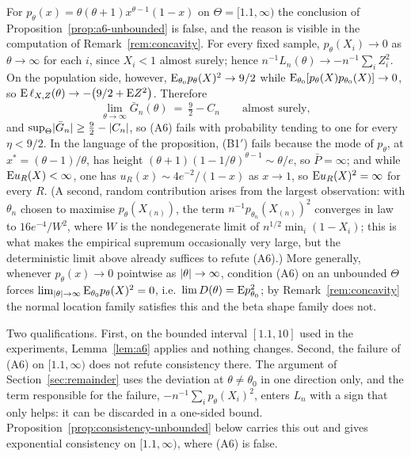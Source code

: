 \begin{remark}
\label{rem:a6-beta-unbounded}
For $p_\theta(x)=\theta(\theta+1)x^{\theta-1}(1-x)$ on $\Theta=[1.1,\infty)$ the conclusion of Proposition~\ref{prop:a6-unbounded} is false, and the reason is visible in the computation of Remark~\ref{rem:concavity}. For every fixed sample, $p_\theta(X_i)\to0$ as $\theta\to\infty$ for each $i$, since $X_i<1$ almost surely; hence $n^{-1}L_n(\theta)\to-n^{-1}\sum_iZ_i^2$. On the population side, however, $\mathrm{E}_{\theta_0}p_\theta(X)^2\to9/2$ while $\mathrm{E}_{\theta_0}[p_\theta(X)p_{\theta_0}(X)]\to0$, so $\mathrm{E}\,\ell_{X,Z}(\theta)\to-\big(9/2+\mathrm{E} Z^2\big)$. Therefore
$$
\lim_{\theta\to\infty}\bar G_n(\theta)\ =\ \tfrac92-C_n\qquad\text{almost surely},
$$
and $\sup_{\Theta}\lvert\bar G_n\rvert\ge\tfrac92-\lvert C_n\rvert$, so (A6) fails with probability tending to one for every $\eta<9/2$. In the language of the proposition, (B1$'$) fails because the mode of $p_\theta$, at $x^*=(\theta-1)/\theta$, has height $(\theta+1)(1-1/\theta)^{\theta-1}\sim\theta/e$, so $\bar P=\infty$; and while $\mathrm{E} u_R(X)<\infty$, one has $u_R(x)\sim4e^{-2}/(1-x)$ as $x\to1$, so $\mathrm{E} u_R(X)^2=\infty$ for every $R$. (A second, random contribution arises from the largest observation: with $\theta_n$ chosen to maximise $p_\theta(X_{(n)})$, the term $n^{-1}p_{\theta_n}(X_{(n)})^2$ converges in law to $16e^{-4}/W^2$, where $W$ is the nondegenerate limit of $n^{1/2}\min_i(1-X_i)$; this is what makes the empirical supremum occasionally very large, but the deterministic limit above already suffices to refute (A6).) More generally, whenever $p_\theta(x)\to0$ pointwise as $\lvert\theta\rvert\to\infty$, condition (A6) on an unbounded $\Theta$ forces $\lim_{\lvert\theta\rvert\to\infty}\mathrm{E}_{\theta_0}p_\theta(X)^2=0$, i.e.\ $\lim D(\theta)=\mathrm{E} p_{\theta_0}^2$; by Remark~\ref{rem:concavity} the normal location family satisfies this and the beta shape family does not.

Two qualifications. First, on the bounded interval $[1.1,10]$ used in the experiments, Lemma~\ref{lem:a6} applies and nothing changes. Second, the failure of (A6) on $[1.1,\infty)$ does not refute consistency there. The argument of Section~\ref{sec:remainder} uses the deviation at $\theta\ne\theta_0$ in one direction only, and the term responsible for the failure, $-n^{-1}\sum_ip_\theta(X_i)^2$, enters $L_n$ with a sign that only helps: it can be discarded in a one-sided bound. Proposition~\ref{prop:consistency-unbounded} below carries this out and gives exponential consistency on $[1.1,\infty)$, where (A6) is false.
\end{remark}

